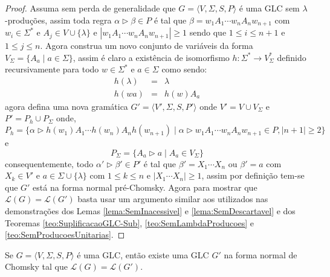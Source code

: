 \begin{proof}
    Assuma sem perda de generalidade que $G = \langle V, \Sigma, S, P \rangle$ é uma GLC sem $\lambda$-produções, assim toda regra $\alpha \rhd \beta \in P$ é tal que $\beta = w_1A_1 \cdots w_{n}A_{n}w_{n+1}$ com $w_i \in \Sigma^*$ e $A_j \in V \cup \{\lambda\}$ e $|w_1A_1 \cdots w_{n}A_{n}w_{n+1}| \geq 1$ sendo que $1 \leq i \leq n+1$ e $1 \leq j \leq n$. Agora construa um novo conjunto de variáveis da forma $V_\Sigma = \{A_a \mid a \in \Sigma\}$, assim é claro a existência de isomorfismo $h: \Sigma^* \rightarrow V_\Sigma^*$ definido recursivamente para todo $w \in \Sigma^*$ e $a \in \Sigma$ como sendo:
    \begin{eqnarray*}
        h(\lambda) & = & \lambda\\
        h(wa) & = & h(w)A_a
    \end{eqnarray*}
    agora defina uma nova gramática $G' = \langle V', \Sigma, S, P' \rangle$ onde $V' = V \cup V_\Sigma$ e $P' = P_h \cup P_\Sigma$ onde, 
    $$P_h = \{\alpha \rhd h(w_1)A_1 \cdots h(w_{n})A_{n}h(w_{n+1}) \mid \alpha \rhd w_1A_1 \cdots w_nA_{n}w_{n+1} \in P, |n+1| \geq 2\}$$
    e
    $$P_\Sigma = \{A_a \rhd a \mid A_a \in V_\Sigma\}$$
    consequentemente, todo $\alpha' \rhd \beta' \in P'$ é tal que $\beta' = X_1\cdots X_n$ ou $\beta' = a$ com $X_k \in V'$ e $a \in \Sigma \cup \{\lambda\}$ com $1 \leq k \leq n$ e $|X_1\cdots X_n| \geq 1$, assim por definição tem-se que $G'$ está na forma normal pré-Chomsky. Agora para mostrar que $\mathcal{L}(G) = \mathcal{L}(G')$  basta usar um argumento similar aos utilizados nas demonstrações dos Lemas \ref{lema:SemInacessivel} e \ref{lema:SemDescartavel} e dos Teoremas \ref{teo:SuplificacaoGLC-Sub},  \ref{teo:SemLambdaProducoes} e \ref{teo:SemProducoesUnitarias}.
\end{proof}

\begin{theorem}\label{teo:NormalChomsky}
    Se $G = \langle V, \Sigma, S, P \rangle$ é uma GLC, então existe uma GLC $G'$ na forma normal de Chomsky tal que $\mathcal{L}(G) = \mathcal{L}(G')$.
\end{theorem}

